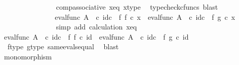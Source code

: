 \begin{isabellebody}
\ \ \ \ \ \ \ \ \ \ \ \ \ \ \isamarkupfalse%
\ comp{\isacharunderscore}{\kern0pt}associative{}\ x{\isacharunderscore}{\kern0pt}eq\ x{\isacharunderscore}{\kern0pt}type\ \isamarkupfalse%
\ {\isacharparenleft}{\kern0pt}typecheck{\isacharunderscore}{\kern0pt}cfuncs{\isacharcomma}{\kern0pt}\ blast{\isacharparenright}{\kern0pt}\isanewline
\ \ \ \ \ \ \ \ \ \ \ \ \isamarkupfalse%
\ \isamarkupfalse%
\ {\isachardoublequoteopen}{\isacharparenleft}{\kern0pt}eval{\isacharunderscore}{\kern0pt}func\ A\ {\isasymOmega}\ {\isasymcirc}\isactrlsub c\ id\isactrlsub c\ {\isasymOmega}\ {\isasymtimes}\isactrlsub f\ f{\isacharparenright}{\kern0pt}\ {\isasymcirc}\isactrlsub c\ x\ {\isacharequal}{\kern0pt}\ {\isacharparenleft}{\kern0pt}eval{\isacharunderscore}{\kern0pt}func\ A\ {\isasymOmega}\ {\isasymcirc}\isactrlsub c\ id\isactrlsub c\ {\isasymOmega}\ {\isasymtimes}\isactrlsub f\ g{\isacharparenright}{\kern0pt}\ {\isasymcirc}\isactrlsub c\ x{\isachardoublequoteclose}\isanewline
\ \ \ \ \ \ \ \ \ \ \ \ \ \ \isamarkupfalse%
\ {\isacharparenleft}{\kern0pt}simp\ add{\isacharcolon}{\kern0pt}\ calculation\ x{\isacharunderscore}{\kern0pt}eq{\isacharparenright}{\kern0pt}\isanewline
\ \ \ \ \ \ \ \ \ \ \isamarkupfalse%
\isanewline
\ \ \ \ \ \ \ \ \isamarkupfalse%
\isanewline
\ \ \ \ \ \ \ \ \isamarkupfalse%
\ \isamarkupfalse%
\ {\isachardoublequoteopen}eval{\isacharunderscore}{\kern0pt}func\ A\ {\isasymOmega}\ {\isasymcirc}\isactrlsub c\ id\isactrlsub c\ {\isasymOmega}\ {\isasymtimes}\isactrlsub f\ f\ {\isasymcirc}\isactrlsub c\ id{\isacharunderscore}{\kern0pt}{}\ {\isacharequal}{\kern0pt}\ eval{\isacharunderscore}{\kern0pt}func\ A\ {\isasymOmega}\ {\isasymcirc}\isactrlsub c\ id\isactrlsub c\ {\isasymOmega}\ {\isasymtimes}\isactrlsub f\ g\ {\isasymcirc}\isactrlsub c\ id{\isacharunderscore}{\kern0pt}{}{\isachardoublequoteclose}\isanewline
\ \ \ \ \ \ \ \ \ \ \isamarkupfalse%
\ \ f{\isacharunderscore}{\kern0pt}type\ g{\isacharunderscore}{\kern0pt}type\ same{\isacharunderscore}{\kern0pt}evals{\isacharunderscore}{\kern0pt}equal\ \isamarkupfalse%
\ blast\isanewline
\ \ \ \ \ \ \ \ \isamarkupfalse%
\isanewline
\ \ \ \ \ \ \isamarkupfalse%
\isanewline
\ \ \ \ \isamarkupfalse%
\isanewline
\ \ \ \ \isamarkupfalse%
\ \isamarkupfalse%
\ {\isachardoublequoteopen}monomorphism{\isacharparenleft}{\kern0pt}{\isasymphi}{\isacharparenright}{\kern0pt}{\isachardoublequoteclose}\isanewline

\end{isabellebody}
